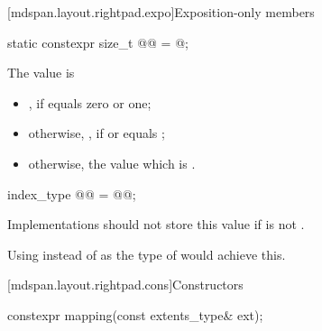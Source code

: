[mdspan.layout.rightpad.expo]{Exposition-only members}

\begin{itemdecl}
static constexpr size_t @@ = @\seebelow@;
\end{itemdecl}

\begin{itemdescr}
\pnum
The value is
\begin{itemize}
\item
{}, if  equals zero or one;
\item
otherwise, ,
if  or  equals
;
\item
otherwise, the  value which is
.
\end{itemize}
\end{itemdescr}

\begin{itemdecl}
index_type @@ = @@;
\end{itemdecl}

\begin{itemdescr}
\pnum
\recommended
Implementations should not store this value
if  is not .
\begin{note}
Using 
instead of  as the type of 
would achieve this.
\end{note}
\end{itemdescr}

[mdspan.layout.rightpad.cons]{Constructors}

%
\begin{itemdecl}
constexpr mapping(const extents_type& ext);
\end{itemdecl}

